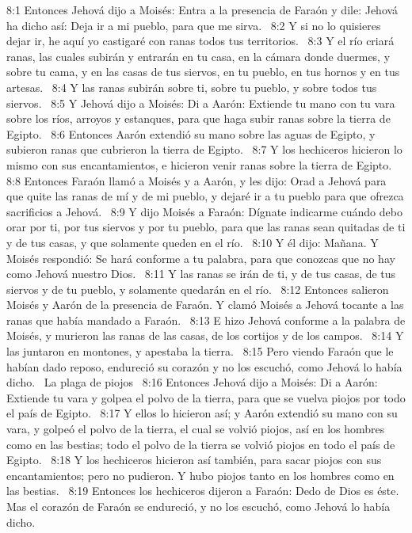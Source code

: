 8:1 Entonces Jehová dijo a Moisés: Entra a la presencia de Faraón y dile: Jehová ha dicho así: Deja ir a mi pueblo, para que me sirva.  
8:2 Y si no lo quisieres dejar ir, he aquí yo castigaré con ranas todos tus territorios.  
8:3 Y el río criará ranas, las cuales subirán y entrarán en tu casa, en la cámara donde duermes, y sobre tu cama, y en las casas de tus siervos, en tu pueblo, en tus hornos y en tus artesas.  
8:4 Y las ranas subirán sobre ti, sobre tu pueblo, y sobre todos tus siervos.  
8:5 Y Jehová dijo a Moisés: Di a Aarón: Extiende tu mano con tu vara sobre los ríos, arroyos y estanques, para que haga subir ranas sobre la tierra de Egipto.  
8:6 Entonces Aarón extendió su mano sobre las aguas de Egipto, y subieron ranas que cubrieron la tierra de Egipto.  
8:7 Y los hechiceros hicieron lo mismo con sus encantamientos, e hicieron venir ranas sobre la tierra de Egipto.  
8:8 Entonces Faraón llamó a Moisés y a Aarón, y les dijo: Orad a Jehová para que quite las ranas de mí y de mi pueblo, y dejaré ir a tu pueblo para que ofrezca sacrificios a Jehová.  
8:9 Y dijo Moisés a Faraón: Dígnate indicarme cuándo debo orar por ti, por tus siervos y por tu pueblo, para que las ranas sean quitadas de ti y de tus casas, y que solamente queden en el río.  
8:10 Y él dijo: Mañana. Y Moisés respondió: Se hará conforme a tu palabra, para que conozcas que no hay como Jehová nuestro Dios.  
8:11 Y las ranas se irán de ti, y de tus casas, de tus siervos y de tu pueblo, y solamente quedarán en el río.  
8:12 Entonces salieron Moisés y Aarón de la presencia de Faraón. Y clamó Moisés a Jehová tocante a las ranas que había mandado a Faraón.  
8:13 E hizo Jehová conforme a la palabra de Moisés, y murieron las ranas de las casas, de los cortijos y de los campos.  
8:14 Y las juntaron en montones, y apestaba la tierra.  
8:15 Pero viendo Faraón que le habían dado reposo, endureció su corazón y no los escuchó, como Jehová lo había dicho.  
La plaga de piojos  
8:16 Entonces Jehová dijo a Moisés: Di a Aarón: Extiende tu vara y golpea el polvo de la tierra, para que se vuelva piojos por todo el país de Egipto.  
8:17 Y ellos lo hicieron así; y Aarón extendió su mano con su vara, y golpeó el polvo de la tierra, el cual se volvió piojos, así en los hombres como en las bestias; todo el polvo de la tierra se volvió piojos en todo el país de Egipto.  
8:18 Y los hechiceros hicieron así también, para sacar piojos con sus encantamientos; pero no pudieron. Y hubo piojos tanto en los hombres como en las bestias.  
8:19 Entonces los hechiceros dijeron a Faraón: Dedo de Dios es éste. Mas el corazón de Faraón se endureció, y no los escuchó, como Jehová lo había dicho.  
